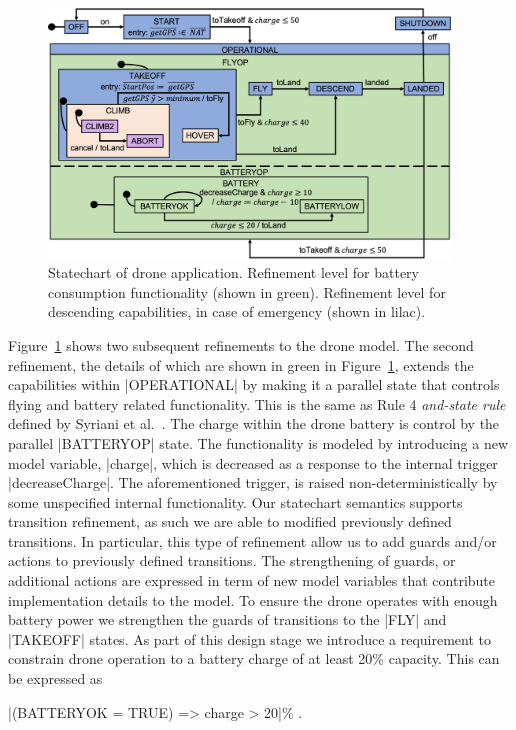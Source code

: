 \begin{figure}[!h]
	\centering
	\includegraphics[width=0.95\textwidth]{figures/Picture5.png}
	\caption{Statechart of drone application. 
	Refinement level for battery consumption functionality (shown in green).
	Refinement level for descending capabilities, in case of emergency (shown in lilac).}
	\label{fig:drone4}
\end{figure} 

Figure~\ref{fig:drone4} shows two subsequent refinements to the drone model.
The second refinement, the details of which are shown in green in Figure~\ref{fig:drone4}, 
extends the capabilities within |OPERATIONAL| by making it a parallel
state that controls flying and battery related functionality. 
This is the same as Rule 4 \emph{and-state rule} defined by Syriani et al.~\cite{Syriani_2019}.
The charge within the drone battery is control by the parallel |BATTERYOP| state. 
The functionality is modeled by introducing a new model variable, |charge|, which is decreased as 
a response to the internal trigger |decreaseCharge|. The aforementioned trigger, is raised non-deterministically by some 
unspecified internal functionality. Our statechart semantics supports transition refinement, as such
we are able to modified previously defined transitions. In particular, this type of refinement allow
us to add guards and/or actions to previously defined transitions. The strengthening of guards, or additional 
actions are expressed in term of new model variables that contribute implementation details to the model.
To ensure the drone operates with enough battery power we strengthen the guards of transitions 
to the |FLY| and |TAKEOFF| states.
As part of this design stage we introduce a requirement to constrain drone operation 
to a battery charge of at least 20\% capacity. This can be expressed as
\begin{center}
  |(BATTERYOK = TRUE) => charge > 20|\% .
\end{center}

